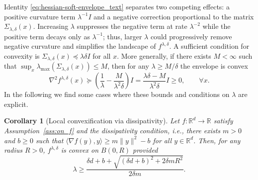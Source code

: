 \documentclass{article}
\newtheorem{corollary}{Corollary}
\newcommand{\R}{\mathbb{R}}
\begin{document}
Identity \eqref{eq:hessian-soft-envelope_text} separates two competing effects: a positive curvature term
$\lambda^{-1}I$ and a negative correction proportional to the matrix $\Sigma_{\lambda,\delta}(x)$.
Increasing $\lambda$ suppresses the negative term at rate $\lambda^{-2}$ while the positive term decays only as
$\lambda^{-1}$; thus, larger $\lambda$ could progressively remove negative curvature and simplifies the landscape of
$f^{\lambda,\delta}$. A sufficient condition for convexity is $\Sigma_{\lambda,\delta}(x) \preceq \lambda\delta I$ for all $x$.
More generally, if there exists $M<\infty$ such that $\sup_x \lambda_{\max}(\Sigma_{\lambda,\delta}(x))\le M$, then for any
$\lambda \geq M/\delta$ the envelope is convex
\[
\nabla^2 f^{\lambda,\delta}(x)
\succeq
\left(\frac{1}{\lambda}-\frac{M}{\lambda^2\delta}\right)I
=
\frac{\lambda\delta-M}{\lambda^2\delta}I\geq 0,
\qquad \forall x.
\]
In the following we find some cases where these bounds and conditions on $\lambda$ are explicit.


\begin{corollary}[Local convexification via dissipativity]\label{cor:convexification_diss}    
    Let $f:\mathbb{R}^d \to \mathbb{R}$ satisfy Assumption~\ref{ass:on_f} and the dissipativity condition, i.e., there exists $m > 0$ and $b \geq 0$ such that $\langle \nabla f(y), y \rangle \geq m\|y\|^2 - b$ for all $y \in \R^d$. Then, for any radius $R > 0$, $f^{\lambda,\delta}$ is convex on $B(0, R)$ provided
    \begin{equation}
        \lambda \geq \frac{\delta d + b + \sqrt{(\delta d + b)^2 + 2\delta m R^2}}{2\delta m}.
    \end{equation}
\end{corollary}
\end{document}
